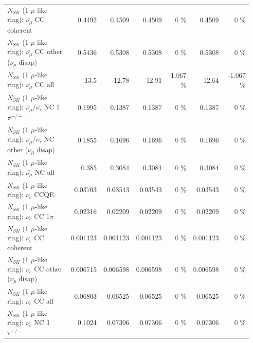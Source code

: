 \begin{table}
\begin{tabular}{| l | r | r | r  r | r  r |}
                       $N_{SK}$ (1 $\mu$-like ring): $\bar{\nu_\mu}$ CC coherent &          0.4492 &          0.4509 &          0.4509 &        0 \%  &          0.4509 &        0 \%  \\ 
        $N_{SK}$ (1 $\mu$-like ring): $\bar{\nu_\mu}$ CC other ($\nu_\mu$ disap) &          0.5436 &          0.5308 &          0.5308 &        0 \%  &          0.5308 &        0 \%  \\ 
                          $N_{SK}$ (1 $\mu$-like ring): $\bar{\nu_{\mu}}$ CC all &            13.5 &           12.78 &           12.91 &    1.067 \%  &           12.64 &   -1.067 \%  \\ 
\hline
  $N_{SK}$ (1 $\mu$-like ring): $\bar{\nu_\mu}$/$\bar{\nu_\tau}$ NC 1$\pi^{+/-}$ &          0.1995 &          0.1387 &          0.1387 &        0 \%  &          0.1387 &        0 \%  \\ 
$N_{SK}$ (1 $\mu$-like ring): $\bar{\nu_\mu}$/$\bar{\nu_\tau}$ NC other ($\nu_\mu$ disap) &          0.1855 &          0.1696 &          0.1696 &        0 \%  &          0.1696 &        0 \%  \\ 
                          $N_{SK}$ (1 $\mu$-like ring): $\bar{\nu_{\mu}}$ NC all &           0.385 &          0.3084 &          0.3084 &        0 \%  &          0.3084 &        0 \%  \\ 
\hline
\hline
\hline
                                      $N_{SK}$ (1 $\mu$-like ring): $\nu_e$ CCQE &         0.03703 &         0.03543 &         0.03543 &        0 \%  &         0.03543 &        0 \%  \\ 
                                 $N_{SK}$ (1 $\mu$-like ring): $\nu_e$ CC 1$\pi$ &         0.02316 &         0.02209 &         0.02209 &        0 \%  &         0.02209 &        0 \%  \\ 
                               $N_{SK}$ (1 $\mu$-like ring): $\nu_e$ CC coherent &        0.001123 &        0.001123 &        0.001123 &        0 \%  &        0.001123 &        0 \%  \\ 
                $N_{SK}$ (1 $\mu$-like ring): $\nu_e$ CC other ($\nu_\mu$ disap) &        0.006715 &        0.006598 &        0.006598 &        0 \%  &        0.006598 &        0 \%  \\ 
                                  $N_{SK}$ (1 $\mu$-like ring): $\nu_{e}$ CC all &         0.06803 &         0.06525 &         0.06525 &        0 \%  &         0.06525 &        0 \%  \\ 
\hline
                           $N_{SK}$ (1 $\mu$-like ring): $\nu_e$ NC 1$\pi^{+/-}$ &          0.1024 &         0.07306 &         0.07306 &        0 \%  &         0.07306 &        0 \%  \\ 

\end{tabular}
\end{table}

